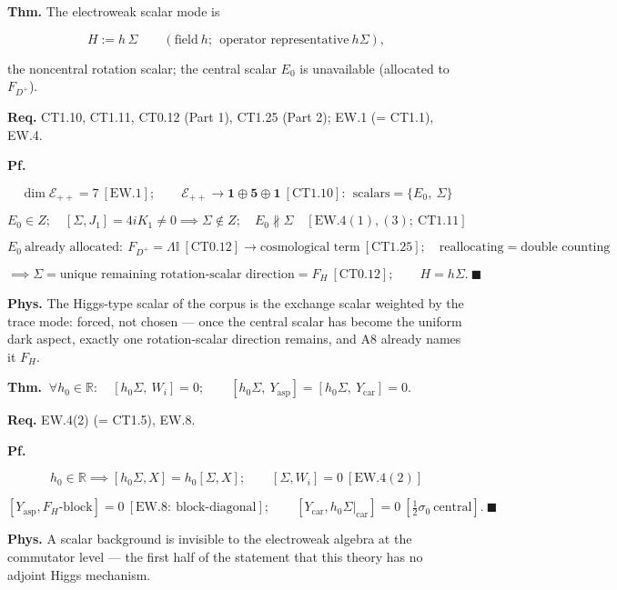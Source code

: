 \begin{theorem}\label{tag:EW-13}
\textbf{Thm.} The electroweak scalar mode is

\[
H:=h\,\Sigma\qquad(\text{field}\ h;\ \ \text{operator representative}\ h\Sigma),
\]

the noncentral rotation scalar; the central scalar $E_0$ is unavailable (allocated to $F_{D^+}$).

\textbf{Req.} CT1.10, CT1.11, CT0.12 (Part 1), CT1.25 (Part 2); EW.1 (= CT1.1), EW.4.

\textbf{Pf.}

\[
\dim\mathcal E_{++}=7\ [\mathrm{EW.1}];\qquad\mathcal E_{++}\to\mathbf1\oplus\mathbf5\oplus\mathbf1\ [\mathrm{CT1.10}]:\ \ \text{scalars}=\{E_0,\ \Sigma\}
\]

\[
E_0\in Z;\quad[\Sigma,J_1]=4iK_1\ne0\implies\Sigma\notin Z;\quad E_0\nparallel\Sigma\quad[\mathrm{EW.4}(1),(3);\ \mathrm{CT1.11}]
\]

\[
E_0\ \text{already allocated}:\ F_{D^+}=\Lambda\mathbb I\ [\mathrm{CT0.12}]\to\text{cosmological term}\ [\mathrm{CT1.25}];\quad\text{reallocating}=\text{double counting}
\]

\[
\implies\Sigma=\text{unique remaining rotation-scalar direction}=F_H\ [\mathrm{CT0.12}];\qquad H=h\Sigma.\ \blacksquare
\]

\textbf{Phys.} The Higgs-type scalar of the corpus is the exchange scalar weighted by the trace mode: forced, not chosen — once the central scalar has become the uniform dark aspect, exactly one rotation-scalar direction remains, and A8 already names it $F_H$.

\end{theorem}

\begin{theorem}\label{tag:EW-14}
\textbf{Thm.} $\ \forall h_0\in\mathbb R:\quad[h_0\Sigma,\ W_i]=0;\qquad[h_0\Sigma,\ Y_{\mathrm{asp}}]=[h_0\Sigma,\ Y_{\mathrm{car}}]=0.$

\textbf{Req.} EW.4(2) (= CT1.5), EW.8.

\textbf{Pf.}

\[
h_0\in\mathbb R\implies[h_0\Sigma,X]=h_0[\Sigma,X];\qquad[\Sigma,W_i]=0\ [\mathrm{EW.4}(2)]
\]

\[
[Y_{\mathrm{asp}},F_H\text{-block}]=0\ [\mathrm{EW.8}:\ \text{block-diagonal}];\qquad
[Y_{\mathrm{car}},h_0\Sigma|_{\mathrm{car}}]=0\ [\tfrac12\sigma_0\ \text{central}].\ \blacksquare
\]

\textbf{Phys.} A scalar background is invisible to the electroweak algebra at the commutator level — the first half of the statement that this theory has no adjoint Higgs mechanism.

\end{theorem}

